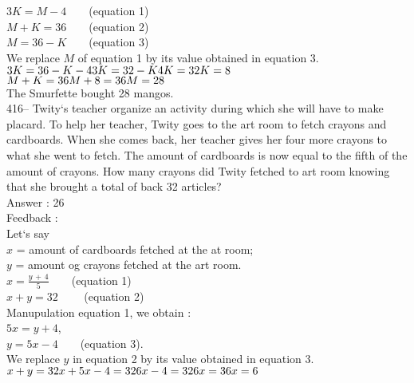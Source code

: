 ﻿\documentclass[letterpaper, 12pt]{article}
\begin{document}
$3K=M-4 \qquad $(equation 1)\\
$M+K=36 \qquad $(equation 2)\\

$M=36-K\qquad $(equation 3)\\

We replace $M$ of equation 1 by its value obtained in equation
3.\\
$3K=36-K-4\\
3K=32-K\\
4K=32\\
K=8$\\

$M+K=36\\
M+8=36\\
M=28$\\
The Smurfette bought 28 mangos.\\

416-- Twity`s teacher organize an activity during which she will have to make placard. To help her teacher, Twity goes to the art room to fetch crayons and cardboards. When she comes back, her teacher gives her four more crayons to what she went to fetch. The amount of cardboards is now equal to the fifth of the amount of crayons. How many crayons did Twity fetched to art room knowing that she brought a total of back 32 articles?\\

Answer : 26\\

Feedback : \\
Let`s say\\
$x$ = amount of cardboards fetched at the at room;\\
$y$ = amount og crayons fetched at the art room.\\

$x=\frac{y\,+\,4}{5}  \qquad $(equation 1)\\
$x+y=32 \qquad $ (equation 2)\\

Manupulation equation 1, we obtain : \\
$5x=y+4$,\\
$y=5x-4  \qquad $(equation 3).\\

We replace $y$ in equation 2 by its value obtained in equation
3.\\
$x+y=32\\
x+5x-4=32\\
6x-4=32\\
6x=36\\
x=6$\\
\end{document}
